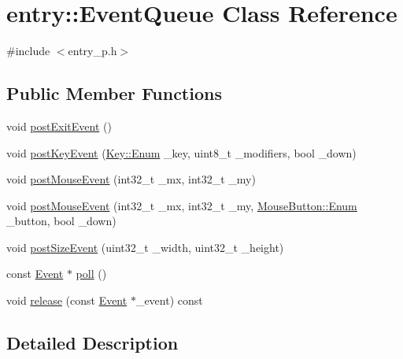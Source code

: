 \hypertarget{classentry_1_1_event_queue}{\section{entry\+:\+:Event\+Queue Class Reference}
\label{classentry_1_1_event_queue}
}


{\ttfamily \#include $<$entry\+\_\+p.\+h$>$}

\subsection*{Public Member Functions}
\begin{DoxyCompactItemize}
\item 
void \hyperlink{classentry_1_1_event_queue_a03606835f06d2aa8328987b43daf2451}{post\+Exit\+Event} ()
\item 
void \hyperlink{classentry_1_1_event_queue_add88e8cd2b1fa8a097f51152d2554086}{post\+Key\+Event} (\hyperlink{structentry_1_1_key_a2c04c2d92f79b961243e4244603ca633}{Key\+::\+Enum} \+\_\+key, uint8\+\_\+t \+\_\+modifiers, bool \+\_\+down)
\item 
void \hyperlink{classentry_1_1_event_queue_a80013b3ff0d4464da2dbfc40cbe0a8d5}{post\+Mouse\+Event} (int32\+\_\+t \+\_\+mx, int32\+\_\+t \+\_\+my)
\item 
void \hyperlink{classentry_1_1_event_queue_a2379a5c35989aec05af0658c154e4c17}{post\+Mouse\+Event} (int32\+\_\+t \+\_\+mx, int32\+\_\+t \+\_\+my, \hyperlink{structentry_1_1_mouse_button_a047d99f30fac4b4483eeb96d815fe54e}{Mouse\+Button\+::\+Enum} \+\_\+button, bool \+\_\+down)
\item 
void \hyperlink{classentry_1_1_event_queue_a91fab6410f808c17059ae91e2c189522}{post\+Size\+Event} (uint32\+\_\+t \+\_\+width, uint32\+\_\+t \+\_\+height)
\item 
const \hyperlink{structentry_1_1_event}{Event} $\ast$ \hyperlink{classentry_1_1_event_queue_afd37e7bee2df02b4ae16de6eff61de55}{poll} ()
\item 
void \hyperlink{classentry_1_1_event_queue_a6a9d996f9a35d9bb5a662799cac40157}{release} (const \hyperlink{structentry_1_1_event}{Event} $\ast$\+\_\+event) const 
\end{DoxyCompactItemize}


\subsection{Detailed Description}


